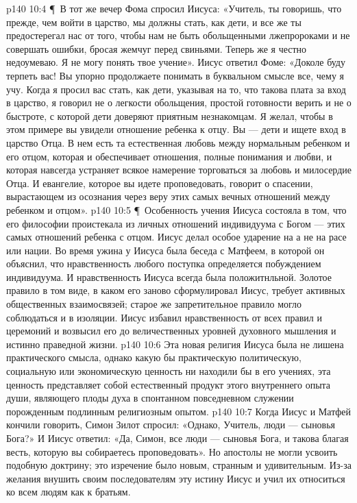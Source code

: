 \vs p140 10:4 \P\ В тот же вечер Фома спросил Иисуса: «Учитель, ты говоришь, что прежде, чем войти в царство, мы должны стать, как дети, и все же ты предостерегал нас от того, чтобы нам не быть обольщенными лжепророками и не совершать ошибки, бросая жемчуг перед свиньями. Теперь же я честно недоумеваю. Я не могу понять твое учение». Иисус ответил Фоме: «Доколе буду терпеть вас! Вы упорно продолжаете понимать в буквальном смысле все, чему я учу. Когда я просил вас стать, как дети, указывая на то, что такова плата за вход в царство, я говорил не о легкости обольщения, простой готовности верить и не о быстроте, с которой дети доверяют приятным незнакомцам. Я желал, чтобы в этом примере вы увидели отношение ребенка к отцу. Вы --- дети и ищете вход в царство  Отца. В нем есть та естественная любовь между нормальным ребенком и его отцом, которая и обеспечивает отношения, полные понимания и любви, и которая навсегда устраняет всякое намерение торговаться за любовь и милосердие Отца. И евангелие, которое вы идете проповедовать, говорит о спасении, вырастающем из осознания через веру этих самых вечных отношений между ребенком и отцом».
\vs p140 10:5 \P\ Особенность учения Иисуса состояла в том, что  его философии проистекала из личных отношений индивидуума с Богом --- этих самых отношений ребенка с отцом. Иисус делал особое ударение на  а не на расе или нации. Во время ужина у Иисуса была беседа с Матфеем, в которой он объяснил, что нравственность любого поступка определяется побуждением индивидуума. И нравственность Иисуса всегда была положитнльной. Золотое правило в том виде, в каком его заново сформулировал Иисус, требует активных общественных взаимосвязей; старое же запретительное правило могло соблюдаться и в изоляции. Иисус избавил нравственность от всех правил и церемоний и возвысил его до величественных уровней духовного мышления и истинно праведной жизни.
\vs p140 10:6 Эта новая религия Иисуса была не лишена практического смысла, однако какую бы практическую политическую, социальную или экономическую ценность ни находили бы в его учениях, эта ценность представляет собой естественный продукт этого внутреннего опыта души, являющего плоды духа в спонтанном повседневном служении порожденным подлинным религиозным опытом.
\vs p140 10:7 Когда Иисус и Матфей кончили говорить, Симон Зилот спросил: «Однако, Учитель,  люди --- сыновья Бога?» И Иисус ответил: «Да, Симон, все люди --- сыновья Бога, и такова благая весть, которую вы собираетесь проповедовать». Но апостолы не могли усвоить подобную доктрину; это изречение было новым, странным и удивительным. Из\hyp{}за желания внушить своим последователям эту истину Иисус и учил их относиться ко всем людям как к братьям.

